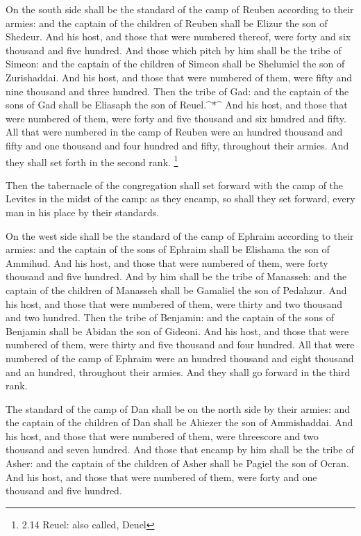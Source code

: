  On the south side shall be the standard of the camp of
Reuben according to their armies: and the captain of the children of
Reuben shall be Elizur the son of Shedeur.  And his host,
and those that were numbered thereof, were forty and six thousand and
five hundred.  And those which pitch by him shall be the
tribe of Simeon: and the captain of the children of Simeon shall be
Shelumiel the son of Zurishaddai.  And his host, and those
that were numbered of them, were fifty and nine thousand and three
hundred.  Then the tribe of Gad: and the captain of the
sons of Gad shall be Eliasaph the son of Reuel.\^{}*\^{} 
And his host, and those that were numbered of them, were forty and five
thousand and six hundred and fifty.  All that were numbered
in the camp of Reuben were an hundred thousand and fifty and one
thousand and four hundred and fifty, throughout their armies. And they
shall set forth in the second rank. \footnote{2.14 Reuel: also called,
  Deuel}

 Then the tabernacle of the congregation shall set forward
with the camp of the Levites in the midst of the camp: as they encamp,
so shall they set forward, every man in his place by their standards.

 On the west side shall be the standard of the camp of
Ephraim according to their armies: and the captain of the sons of
Ephraim shall be Elishama the son of Ammihud.  And his
host, and those that were numbered of them, were forty thousand and five
hundred.  And by him shall be the tribe of Manasseh: and
the captain of the children of Manasseh shall be Gamaliel the son of
Pedahzur.  And his host, and those that were numbered of
them, were thirty and two thousand and two hundred.  Then
the tribe of Benjamin: and the captain of the sons of Benjamin shall be
Abidan the son of Gideoni.  And his host, and those that
were numbered of them, were thirty and five thousand and four hundred.
 All that were numbered of the camp of Ephraim were an
hundred thousand and eight thousand and an hundred, throughout their
armies. And they shall go forward in the third rank.

 The standard of the camp of Dan shall be on the north side
by their armies: and the captain of the children of Dan shall be Ahiezer
the son of Ammishaddai.  And his host, and those that were
numbered of them, were threescore and two thousand and seven hundred.
 And those that encamp by him shall be the tribe of Asher:
and the captain of the children of Asher shall be Pagiel the son of
Ocran.  And his host, and those that were numbered of them,
were forty and one thousand and five hundred.

